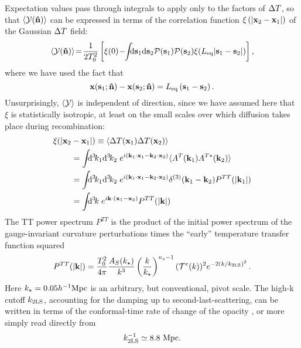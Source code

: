 \documentclass[fleqn,usenatbib]{mnras}
\begin{document}
    Expectation values pass through integrals to apply only to the factors of
    ${\Delta T}$, so that $\left\langle \mathcal{Y}(\mathbf{{\bf\hat{n}}})\right\rangle$ can be
    expressed in terms of the correlation function $\xi\left(\lvert \mathbf{x}_2 -
    \mathbf{x}_1 \rvert \right)$ of the Gaussian ${\Delta T}$ field:
    \begin{equation}
        \left\langle \Yd(\mbf{\nhat})\right\rangle
            \!=\! \frac{1}{2T_0^2 } \left[
                \xi(0)
                \!-\!\! \int\!\!\!\dif{\mbf{s}_1}\dif{\mbf{s}_2}
                    \mcal{P}(\mbf{s}_1) \mcal{P}(\mbf{s}_2)
                    \xi(\Leq\norm{\mbf{s}_1 - \mbf{s}_2})
            \right],
    \end{equation}
    where we have used the fact that
    \begin{equation}
        \mathbf{x}(\mathbf{s}_1;\mathbf{{\bf\hat{n}}}) - \mathbf{x}(\mathbf{s}_2;\mathbf{{\bf\hat{n}}})
            = L_{\rm eq} \, (\mathbf{s}_1-\mathbf{s}_2)\,.
    \end{equation}
    Unsurprisingly, $\langle\mathcal{Y}\rangle$ is independent of direction, since we
    have assumed here that $\xi$ is statistically isotropic, at least on the
    small scales over which diffusion takes place during recombination:
    \begin{align} \label{eq:xiinrealspace}
        \xi(\norm{\mbf{x}_2 & - \mbf{x}_1})
            \equiv \left\langle \DeltaT(\mbf{x}_1) \DeltaT(\mbf{x}_2)\right\rangle
            \\
            &=
            \int\!\!\! \dif[3]{k_1} \dif[3]{k_2} \;
                \Exp{i(\mbf{k}_1\cdot\mbf{x}_1 - \mbf{k}_2\cdot\mbf{x}_2)}
                \langle A^T(\mbf{k}_1) A^{T*}(\mbf{k}_2) \rangle
            \\
            &=
            \int\!\!\! \dif[3]{k_1} \dif[3]{k_2} \;
                \Exp{i(\mbf{k}_1\cdot\mbf{x}_1 - \mbf{k}_2\cdot\mbf{x}_2)}
            \delta^{(3)}(\mbf{k}_1-\mbf{k}_2)
            P^{TT}(\norm{\mbf{k}_1})
            \\
            &=
            \int\!\!\! \dif[3]k \; \Exp{ i\mbf{k}\cdot(\mbf{x}_1-\mbf{x}_2) }
            P^{TT}(\norm{\mbf{k}})
    \end{align}
    The TT power spectrum $P^{TT}$ is the product of the initial power spectrum
    of the gauge-invariant curvature perturbations times the ``early''
    temperature transfer function squared
    \begin{equation}
        P^{TT}(\lvert \mathbf{k} \rvert)
            = \frac{T_0^2}{4\pi}
              \frac{A_S(k_\star)}{k^3}
              \left(\frac{k}{k_\star}\right)^{n_s-1}
              ({\cal{T}}^e(k))^2
              e^{-2 (k/k_{2\rm{LS}})^2}\,.
    \end{equation}
    Here $k_\star=0.05 h^{-1}\rm{Mpc}$ is an arbitrary, but conventional, pivot
    scale.  The high-k cutoff $k_{2\rm{LS}}$, accounting for the damping up to
    second-last-scattering, can be written in terms of the conformal-time rate
    of change of the opacity \citep{Jungman+1996}, or more simply read directly
    from \citet[][eq. 7.139]{Baumann2022}
    \begin{equation}
        k_{2\rm{LS}}^{-1} \simeq 8.8 \ \rm{Mpc}.
    \end{equation}
\end{document}
